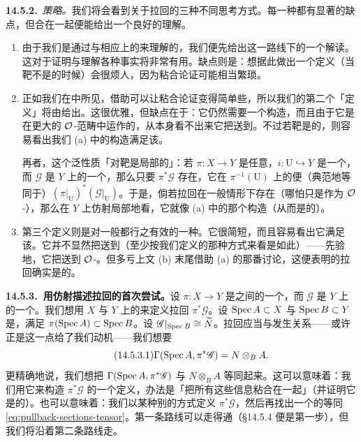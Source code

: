 \textbf{14.5.2.}\ \emph{策略。}\quad 我们将会看到关于拉回的三种不同思考方式。每一种都有显著的缺点，但合在一起便能给出一个良好的理解。
\begin{enumerate}[label=(\alph*)]
\item 由于我们是通过\trAffine\trOpenSet{}与相应\trRing{}上的\trModule{}来理解\trQCSheaf{}的，我们便先给出这一路线下的一个解读。这对于证明与理解各种事实将非常有用。缺点则是：想据此做出一个定义（当靶不是\trAffine{}的时候）会很烦人，因为粘合论证可能相当繁琐。
\item 正如我们在\trFiberProduct{}中所见，借助\trUniversalProperty{}可以让粘合论证变得简单些，所以我们的第二个「定义」将由\trUniversalProperty{}给出。这很优雅，但缺点在于：它仍然需要一个构造，而且由于它是在更大的 $\mathcal{O}$-\trModule{}范畴中运作的，从\trUniversalProperty{}本身看不出来它把\trQCSheaf{}送到\trQCSheaf。不过若靶是\trAffine{}的，则容易看出我们 (a) 中的构造满足该\trUniversalProperty。

再者，这个泛性质「对靶是局部的」：若 $\pi\colon X\to Y$ 是任意\trMorphism，$i\colon\mathrm{U}\hookrightarrow Y$ 是一个\trOpenEmbedding，而 $\mathscr{G}$ 是 $Y$ 上的一个\trQCSheaf，那么只要 $\pi^*\mathscr{G}$ 存在，它在 $\pi^{-1}(\mathrm{U})$ 上的\trRestriction{}便（典范地等同于）$(\pi|_{\mathrm{U}})^*(\mathscr{G}|_{\mathrm{U}})$。于是，倘若拉回在一般情形下存在（哪怕只是作为 $\mathcal{O}$-\trModule），那么在 $Y$ 上仿射局部地看，它就像 (a) 中的那个构造（从而是\trQC{}的）。
\item 第三个定义则是对一般\trRingedSpace{}都行之有效的一种。它很简短，而且容易看出它满足该\trUniversalProperty。它并不显然把\trQCSheaf{}送到\trQCSheaf（至少按我们定义\trQCSheaf{}的那种方式来看是如此）——先验地，它把\trQCSheaf{}送到 $\mathcal{O}$-\trModule。但多亏上文 (b) 末尾借助 (a) 的那番讨论，这便表明\trQCSheaf{}的拉回确实是\trQC{}的。
\end{enumerate}

\textbf{14.5.3.\ 用仿射描述拉回的首次尝试。}\quad 设 $\pi\colon X\to Y$ 是\trScheme{}之间的一个\trMorphism，而 $\mathscr{G}$ 是 $Y$ 上的一个\trQCSheaf。我们想用 $X$ 与 $Y$ 上的\trAffine\trOpenSet{}来定义拉回\trQCSheaf{} $\pi^*\mathscr{G}$。设 $\operatorname{Spec} A\subset X$ 与 $\operatorname{Spec} B\subset Y$ 是\trAffine\trOpenSet，满足 $\pi(\operatorname{Spec} A)\subset\operatorname{Spec} B$。设 $\mathscr{G}\vert_{\operatorname{Spec} B}\cong\widetilde{N}$。拉回应当与\trTensorProduct{}发生关系——或许正是这一点给了我们动机——我们想要
\begin{equation*}\tag{14.5.3.1}\label{eq:pullback-sections-tensor}
\Gamma(\operatorname{Spec} A,\pi^*\mathscr{G})=N\otimes_B A.
\end{equation*}
更精确地说，我们想把 $\Gamma(\operatorname{Spec} A,\pi^*\mathscr{G})$ 与 $N\otimes_B A$ 等同起来。这可以意味着：我们用它来构造 $\pi^*\mathscr{G}$ 的一个定义，办法是「把所有这些信息粘合在一起」（并证明它是\trWellDefined{}的）。也可以意味着：我们以某种别的方式定义 $\pi^*\mathscr{G}$，然后再找出一个\trNatural{}的等同 \eqref{eq:pullback-sections-tensor}。第一条路线可以走得通（\S14.5.4 便是第一步），但我们将沿着第二条路线走。


